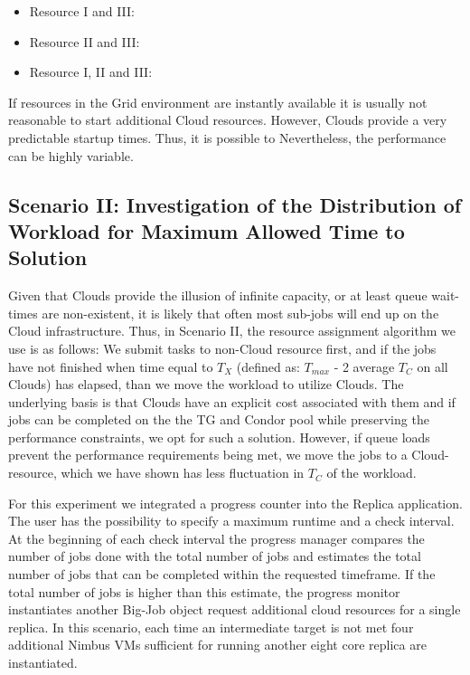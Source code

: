 \documentclass[conference,final]{IEEEtran}
\newcommand{\tmax}{$T_{max}$ }
\newcommand{\tc}{$T_{C}$ }
\begin{document}
\begin{itemize}
\item Resource I and III:
\item Resource II and III:
\item Resource I, II and III:
\end{itemize}


If resources in the Grid environment are instantly available it is usually not reasonable to start
additional Cloud resources. However, Clouds provide a very predictable startup times. Thus,
it is possible to  Nevertheless,
the performance can be highly variable.

\subsection{Scenario II: Investigation of the Distribution of Workload for Maximum Allowed
  Time to Solution} 

Given that Clouds provide the illusion of infinite capacity, or at
least queue wait-times are non-existent, it is likely that often most
sub-jobs will end up on the Cloud infrastructure.  Thus, in Scenario
II, the resource assignment algorithm we use is as follows: We submit
tasks to non-Cloud resource first, and if the jobs have not finished
when time equal to $T_{X}$ (defined as: \tmax - 2 average \tc on all
Clouds) has elapsed, than we move the workload to utilize Clouds.  The
underlying basis is that Clouds have an explicit cost associated with
them and if jobs can be completed on the the TG and Condor pool while
preserving the performance constraints, we opt for such a
solution. However, if queue loads prevent the performance requirements
being met, we move the jobs to a Cloud-resource, which we have shown
has less fluctuation in \tc of the workload.

For this experiment we integrated a progress counter into the Replica application.
The user has the possibility to specify a maximum runtime and a check interval.
At the beginning of each check interval the progress manager compares the number 
of jobs done with the total number of jobs and estimates the total 
number of jobs that can be completed within the requested timeframe. If the total
number of jobs is higher than this estimate, the progress monitor instantiates
another Big-Job object request additional cloud resources for a single replica. 
In this scenario, each time an intermediate target is not met four additional 
Nimbus VMs sufficient for running another eight core replica are instantiated.
\end{document}
